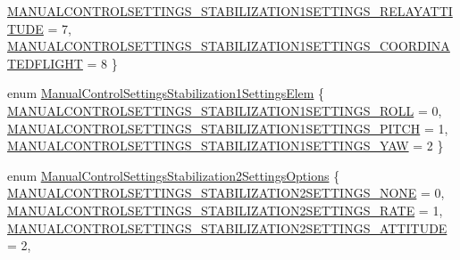 \begin{DoxyCompactItemize}
\hyperlink{group___manual_control_settings_gga9503b3f6b8095b4705774caf4b6f3eb5abd1b48f89c352e5fb78764ce5d3ebb58}{\-M\-A\-N\-U\-A\-L\-C\-O\-N\-T\-R\-O\-L\-S\-E\-T\-T\-I\-N\-G\-S\-\_\-\-S\-T\-A\-B\-I\-L\-I\-Z\-A\-T\-I\-O\-N1\-S\-E\-T\-T\-I\-N\-G\-S\-\_\-\-R\-E\-L\-A\-Y\-A\-T\-T\-I\-T\-U\-D\-E} = 7, 
\*
\hyperlink{group___manual_control_settings_gga9503b3f6b8095b4705774caf4b6f3eb5a0e46c26044473a7a2f84739e39466438}{\-M\-A\-N\-U\-A\-L\-C\-O\-N\-T\-R\-O\-L\-S\-E\-T\-T\-I\-N\-G\-S\-\_\-\-S\-T\-A\-B\-I\-L\-I\-Z\-A\-T\-I\-O\-N1\-S\-E\-T\-T\-I\-N\-G\-S\-\_\-\-C\-O\-O\-R\-D\-I\-N\-A\-T\-E\-D\-F\-L\-I\-G\-H\-T} = 8
 \}
\item 
enum \hyperlink{group___manual_control_settings_ga0b7aa0cfc5bf008d079addf70e378cb5}{\-Manual\-Control\-Settings\-Stabilization1\-Settings\-Elem} \{ \hyperlink{group___manual_control_settings_gga0b7aa0cfc5bf008d079addf70e378cb5a505457443f91c3957b544600d2370163}{\-M\-A\-N\-U\-A\-L\-C\-O\-N\-T\-R\-O\-L\-S\-E\-T\-T\-I\-N\-G\-S\-\_\-\-S\-T\-A\-B\-I\-L\-I\-Z\-A\-T\-I\-O\-N1\-S\-E\-T\-T\-I\-N\-G\-S\-\_\-\-R\-O\-L\-L} = 0, 
\hyperlink{group___manual_control_settings_gga0b7aa0cfc5bf008d079addf70e378cb5a5bb736be6d2595b2b4e971c346ca6234}{\-M\-A\-N\-U\-A\-L\-C\-O\-N\-T\-R\-O\-L\-S\-E\-T\-T\-I\-N\-G\-S\-\_\-\-S\-T\-A\-B\-I\-L\-I\-Z\-A\-T\-I\-O\-N1\-S\-E\-T\-T\-I\-N\-G\-S\-\_\-\-P\-I\-T\-C\-H} = 1, 
\hyperlink{group___manual_control_settings_gga0b7aa0cfc5bf008d079addf70e378cb5a7c0bb92b56541b894f98f06647e9c1bc}{\-M\-A\-N\-U\-A\-L\-C\-O\-N\-T\-R\-O\-L\-S\-E\-T\-T\-I\-N\-G\-S\-\_\-\-S\-T\-A\-B\-I\-L\-I\-Z\-A\-T\-I\-O\-N1\-S\-E\-T\-T\-I\-N\-G\-S\-\_\-\-Y\-A\-W} = 2
 \}
\item 
enum \hyperlink{group___manual_control_settings_ga2ff26eb42e2fe951905ac17ef6514fab}{\-Manual\-Control\-Settings\-Stabilization2\-Settings\-Options} \{ \*
\hyperlink{group___manual_control_settings_gga2ff26eb42e2fe951905ac17ef6514fabaada8d79736005b329ba508267ffdf3ed}{\-M\-A\-N\-U\-A\-L\-C\-O\-N\-T\-R\-O\-L\-S\-E\-T\-T\-I\-N\-G\-S\-\_\-\-S\-T\-A\-B\-I\-L\-I\-Z\-A\-T\-I\-O\-N2\-S\-E\-T\-T\-I\-N\-G\-S\-\_\-\-N\-O\-N\-E} = 0, 
\hyperlink{group___manual_control_settings_gga2ff26eb42e2fe951905ac17ef6514faba99eedf34462f7d771c1f21f9d5d15b19}{\-M\-A\-N\-U\-A\-L\-C\-O\-N\-T\-R\-O\-L\-S\-E\-T\-T\-I\-N\-G\-S\-\_\-\-S\-T\-A\-B\-I\-L\-I\-Z\-A\-T\-I\-O\-N2\-S\-E\-T\-T\-I\-N\-G\-S\-\_\-\-R\-A\-T\-E} = 1, 
\hyperlink{group___manual_control_settings_gga2ff26eb42e2fe951905ac17ef6514faba414951c82a83512c9ae490d0aea7600a}{\-M\-A\-N\-U\-A\-L\-C\-O\-N\-T\-R\-O\-L\-S\-E\-T\-T\-I\-N\-G\-S\-\_\-\-S\-T\-A\-B\-I\-L\-I\-Z\-A\-T\-I\-O\-N2\-S\-E\-T\-T\-I\-N\-G\-S\-\_\-\-A\-T\-T\-I\-T\-U\-D\-E} = 2, 

\end{DoxyCompactItemize}
